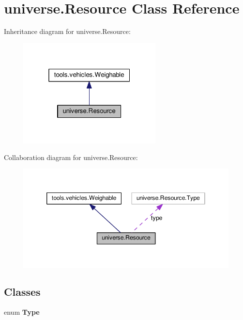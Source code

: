 \hypertarget{classuniverse_1_1_resource}{}\section{universe.\+Resource Class Reference}
\label{classuniverse_1_1_resource}


Inheritance diagram for universe.\+Resource\+:
\nopagebreak
\begin{figure}[H]
\begin{center}
\leavevmode
\includegraphics[width=205pt]{classuniverse_1_1_resource__inherit__graph}
\end{center}
\end{figure}


Collaboration diagram for universe.\+Resource\+:
\nopagebreak
\begin{figure}[H]
\begin{center}
\leavevmode
\includegraphics[width=346pt]{classuniverse_1_1_resource__coll__graph}
\end{center}
\end{figure}
\subsection*{Classes}
\begin{DoxyCompactItemize}
\item 
enum {\bfseries Type}
\end{DoxyCompactItemize}
